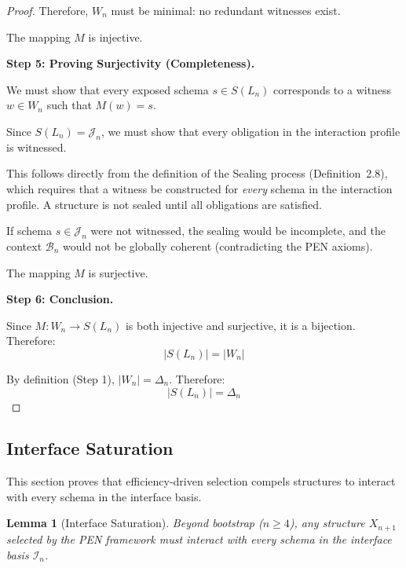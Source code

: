 \documentclass[11pt]{article}
\newtheorem{lemma}[theorem]{Lemma}
\theoremstyle{definition}
\theoremstyle{remark}
\begin{document}
\begin{proof}
Therefore, $W_n$ must be minimal: no redundant witnesses exist.

The mapping $M$ is injective.

\textbf{Step 5: Proving Surjectivity (Completeness).}

We must show that every exposed schema $s \in S(L_n)$ corresponds to a witness $w \in W_n$ such that
$M(w) = s$.

Since $S(L_n) = \mathcal{J}_n$, we must show that every obligation in the interaction profile is witnessed.

This follows directly from the definition of the Sealing process (Definition~2.8), which requires
that a witness be constructed for \emph{every} schema in the interaction profile. A structure is not
sealed until all obligations are satisfied.

If schema $s \in \mathcal{J}_n$ were not witnessed, the sealing would be incomplete, and the context $\mathcal{B}_n$
would not be globally coherent (contradicting the PEN axioms).

The mapping $M$ is surjective.

\textbf{Step 6: Conclusion.}

Since $M: W_n \to S(L_n)$ is both injective and surjective, it is a bijection. Therefore:
\[
|S(L_n)| = |W_n|
\]

By definition (Step 1), $|W_n| = \Delta_n$. Therefore:
\[
|S(L_n)| = \Delta_n
\]
\end{proof}

\subsection{Interface Saturation}
\label{app:saturation}

This section proves that efficiency-driven selection compels structures to interact with every
schema in the interface basis.

\begin{lemma}[Interface Saturation]
\label{lem:saturation-full}
Beyond bootstrap ($n \geq 4$), any structure $X_{n+1}$ selected by the PEN framework must interact
with every schema in the interface basis $\mathcal{I}_n$.
\end{lemma}
\end{document}
